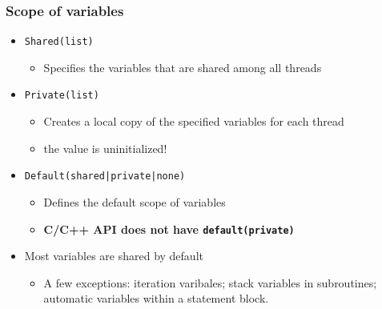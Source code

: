 \documentclass[slidestop,mathserif,compress,xcolor=svgnames]{beamer}
\begin{document}
\begin{frame}
  \frametitle{\small Scope of variables}
  \begin{itemize}
    \item \texttt{Shared(list)}
    \begin{itemize}
      \item Specifies the variables that are shared among all threads
    \end{itemize}
    \item \texttt{Private(list)}
    \begin{itemize}
      \item Creates a local copy of the specified variables for each thread
      \item the value is uninitialized!
    \end{itemize}
    \item \texttt{Default(shared|private|none)}
    \begin{itemize}
      \item Defines the default scope of variables
      \item \textbf{C/C++ API does not have \texttt{default(private)}}
    \end{itemize}
    \item Most variables are shared by default
    \begin{itemize}
      \item A few exceptions: iteration varibales; stack variables in subroutines; automatic variables within a statement block.
    \end{itemize}
  \end{itemize}
\end{frame}
\end{document}
